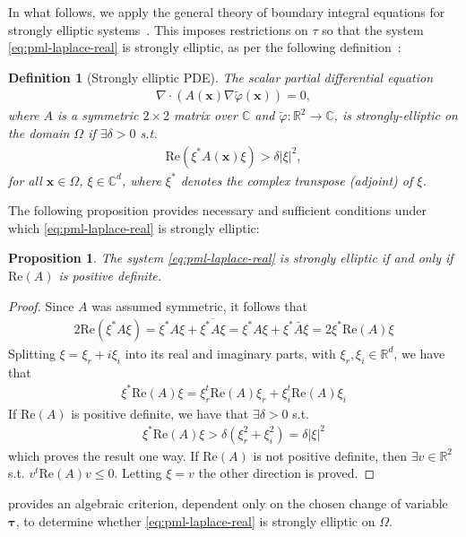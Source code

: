 \documentclass[11pt]{article}
\newcommand{\R}{\mathbb{R}}
\newcommand{\C}{\mathbb{C}}
\newcommand{\bx}{\mathbf{x}}
\newcommand{\btau}{\mathbf{\tau}}
\newcommand{\tvarphi}{\tilde \varphi}
\newtheorem{proposition}[theorem]{Proposition}
\newtheorem{definition}[theorem]{Definition}
\begin{document}
In what follows, we apply the general theory of boundary integral equations for
strongly elliptic systems~\cite{mclean2000strongly}. This imposes restrictions
on $\tau$ so that the system \cref{eq:pml-laplace-real} is strongly elliptic, as
per the following definition~\cite[equation 4.7]{mclean2000strongly}:
\begin{definition}[Strongly elliptic PDE]
  The scalar partial differential equation
  \begin{align}
    \nabla \cdot \left( A(\bx) \nabla \tvarphi(\bx) \right) = 0,
  \end{align}
  where $A$ is a symmetric $2 \times 2$ matrix over $\mathbb{C}$ and
  $\tvarphi : \R^2 \to \C$, is strongly-elliptic on the domain $\Omega$
  if $\exists \delta > 0$ s.t.
  \begin{align}
    \mathrm{Re}\left( \xi^* A(\bx) \xi \right) > \delta |\xi|^2,
  \end{align}
  for all $\bx \in \Omega$, $\xi \in \C^{d}$, where $\xi^*$ denotes the complex
  transpose (adjoint) of $\xi$.
\end{definition}

The following proposition provides necessary and sufficient conditions under
which \cref{eq:pml-laplace-real} is strongly elliptic:
%
\begin{proposition}
  \label{pr:algebraic-condition-strongly-elliptic}
  The system \cref{eq:pml-laplace-real} is strongly elliptic if and only if
  $\mathrm{Re}(A)$ is positive definite.
\end{proposition}
\begin{proof}
  Since $A$ was assumed symmetric, it follows that
  \begin{align}
  2 \mathrm{Re}(\xi^* A \xi) = \xi^* A \xi + \overline{\xi^* A \xi}= \xi^* A \xi + \xi^* \bar{A} \xi = 2 \xi^* \mathrm{Re}(A) \xi
  \end{align}
  Splitting $\xi = \xi_r + i\xi_i$ into its real and imaginary parts, with
  $\xi_r,\xi_i \in \R^d$, we have that
  \begin{align}
  \xi^* \mathrm{Re}(A) \xi = \xi_r^t \mathrm{Re}(A) \xi_r + \xi_i^t \mathrm{Re}(A) \xi_i
  \end{align}
  If $\mathrm{Re}(A)$ is positive definite, we have that $\exists \delta > 0$ s.t.
  \begin{align}
  \xi^* \mathrm{Re}(A) \xi > \delta (\xi_r^2 + \xi_i^2) = \delta |\xi|^2
  \end{align}
  which proves the result one way. If $\mathrm{Re}(A)$ is not positive definite,
  then $\exists v \in \R^2$ s.t. $v^t \mathrm{Re}(A) v \leq 0$. Letting $\xi = v$
  the other direction is proved.
\end{proof}
 provides an algebraic criterion,
dependent only on the chosen change of variable $\btau$, to determine whether
\cref{eq:pml-laplace-real} is strongly elliptic on $\Omega$. 
\end{document}
